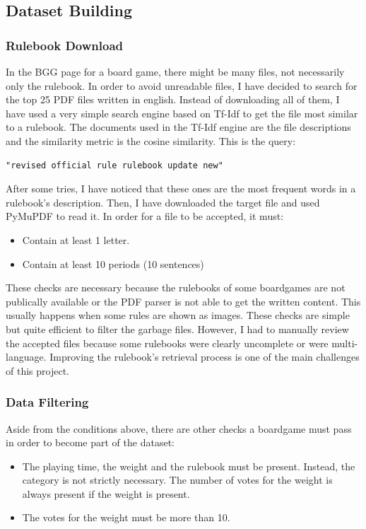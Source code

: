 \documentclass[runningheads]{llncs}
\begin{document}
\subsection{Dataset Building}
\subsubsection{Rulebook Download}
In the BGG page for a board game, there might be many files, not necessarily only the rulebook. In order to avoid unreadable files, I have decided to search for the top 25 PDF files written in english. Instead of downloading all of them, I have used a very simple search engine based on Tf-Idf to get the file most similar to a rulebook. The documents used in the Tf-Idf engine are the file descriptions and the similarity metric is the cosine similarity. This is the query:

\begin{verbatim}
"revised official rule rulebook update new"
\end{verbatim}

\noindent After some tries, I have noticed that these ones are the most frequent words in a rulebook's description. Then, I have downloaded the target file and used PyMuPDF to read it. In order for a file to be accepted, it must:
\begin{itemize}
    \item Contain at least 1 letter.
    \item Contain at least 10 periods (10 sentences)
\end{itemize}

\noindent These checks are necessary because the rulebooks of some boardgames are not publically available or the PDF parser is not able to get the written content. This usually happens when some rules are shown as images.
These checks are simple but quite efficient to filter the garbage files. However, I had to manually review the accepted files because some rulebooks were clearly uncomplete or were multi-language. Improving the rulebook's retrieval process is one of the main challenges of this project.

\subsubsection{Data Filtering}
Aside from the conditions above, there are other checks a boardgame must pass in order to become part of the dataset:

\begin{itemize}
    \item The playing time, the weight and the rulebook must be present. Instead, the category is not strictly necessary. The number of votes for the weight is always present if the weight is present.
    \item The votes for the weight must be more than 10.
\end{itemize}
\end{document}

